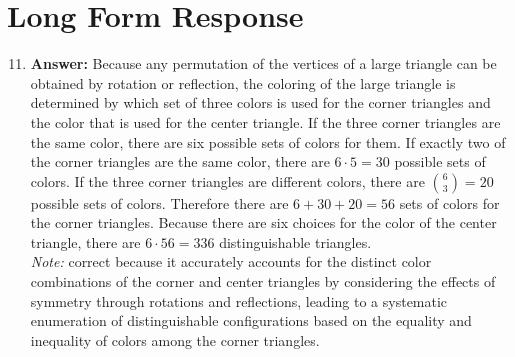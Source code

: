 \documentclass[12pt]{article}
\begin{document}
\section*{Long Form Response}
\begin{enumerate}[label=\arabic*.]
\setcounter{enumi}{10}
\item \textbf{Answer:} Because any permutation of the vertices of a large triangle can be obtained by rotation or reflection, the coloring of the large triangle is determined by which set of three colors is used for the corner triangles and the color that is used for the center triangle. If the three corner triangles are the same color, there are six possible sets of colors for them. If exactly two of the corner triangles are the same color, there are $6\cdot 5=30$ possible sets of colors. If the three corner triangles are different colors, there are ${6\choose 3}=20$ possible sets of colors. Therefore there are $6+30+20=56$ sets of colors for the corner triangles. Because there are six choices for the color of the center triangle, there are $6\cdot 56=\boxed{336}$ distinguishable triangles.
\\ \textit{Note:} correct because it accurately accounts for the distinct color combinations of the corner and center triangles by considering the effects of symmetry through rotations and reflections, leading to a systematic enumeration of distinguishable configurations based on the equality and inequality of colors among the corner triangles.

\end{enumerate}
\end{document}
